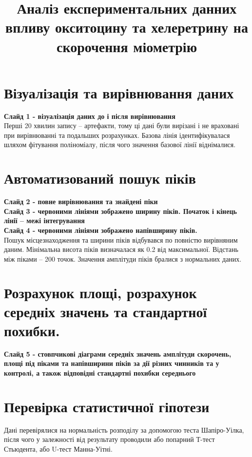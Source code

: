 \documentclass[12pt, a4paper]{article}
\title{Аналіз експериментальних данних впливу окситоцину та хелеретрину на
        скорочення міометрію}
\date{}
\begin{document}
\maketitle

\thispagestyle{empty}
\section{Візуалізація та вирівнювання даних}
\textbf{Слайд 1 - візуалізація даних до і після вирівнювання}
\\
Перші 20 хвилин запису -- артефакти, тому ці дані були вирізані і не враховані
при вирівнюванні та подальших розрахунках. Базова лінія ідентифікувалася шляхом
фітування поліноміалу, після чого значення базової лінії віднімалися.

\section{Автоматизований пошук піків}
\textbf{Слайд 2 - повне вирівнювання та знайдені піки}
\\
\textbf{Слайд 3 - червоними лініями зображено ширину піків. Початок і кінець
лінії --  межі інтегрування}
\\
\textbf{Слайд 4 - червоними лініями зображено напівширину піків.}
\\
Пошук місцезнаходження та ширини піків відбувався по повністю вирівняним даним. Мінімальна
висота піків визначалася як 0.2 від максимальної. Відстань між піками -- 200
точок. Значення амплітуди піків бралися з нормальних даних. 

\section{Розрахунок площі, розрахунок середніх значень та стандартної похибки.}
\textbf{Слайд 5 - стовпчикові діаграми середніх значень амплітуди скорочень,
площі під піками та напівширини піків за дії різних чинників та у контролі, а
також відповідні стандартні похибки середнього} 

\section{Перевірка статистичної гіпотези}
Дані перевірялися на нормальність розподілу за допомогою теста Шапіро-Уілка,
після чого у залежності від результату проводили або попарний Т-тест Стьюдента,
або U-тест Манна-Уітні.
\end{document}
